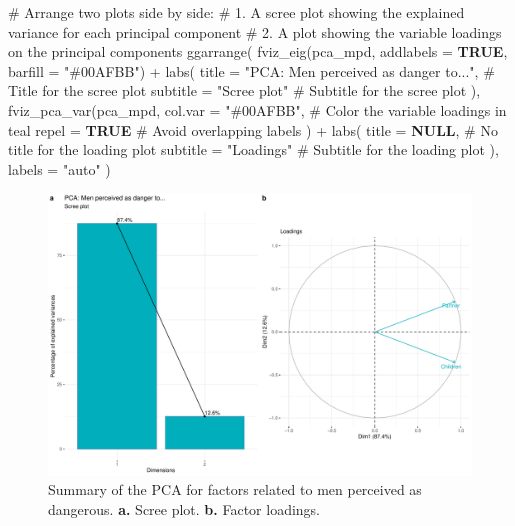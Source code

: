 \documentclass[
  bookmarksnumbered]{article}
\newenvironment{Shaded}{\begin{snugshade}}{\end{snugshade}}
\newcommand{\AttributeTok}[1]{\textcolor[rgb]{0.80,0.80,0.80}{#1}}
\newcommand{\CommentTok}[1]{\textcolor[rgb]{0.50,0.62,0.50}{#1}}
\newcommand{\ConstantTok}[1]{\textcolor[rgb]{0.86,0.64,0.64}{\textbf{#1}}}
\newcommand{\FunctionTok}[1]{\textcolor[rgb]{0.94,0.94,0.56}{#1}}
\newcommand{\NormalTok}[1]{\textcolor[rgb]{0.80,0.80,0.80}{#1}}
\newcommand{\SpecialCharTok}[1]{\textcolor[rgb]{0.86,0.64,0.64}{#1}}
\newcommand{\StringTok}[1]{\textcolor[rgb]{0.80,0.58,0.58}{#1}}
\begin{document}
\begin{Shaded}
\begin{Highlighting}[]
\CommentTok{\# Arrange two plots side by side:}
\CommentTok{\# 1. A scree plot showing the explained variance for each principal component}
\CommentTok{\# 2. A plot showing the variable loadings on the principal components}
\FunctionTok{ggarrange}\NormalTok{(}
  \FunctionTok{fviz\_eig}\NormalTok{(pca\_mpd, }\AttributeTok{addlabels =} \ConstantTok{TRUE}\NormalTok{, }\AttributeTok{barfill =} \StringTok{"\#00AFBB"}\NormalTok{) }\SpecialCharTok{+}
    \FunctionTok{labs}\NormalTok{(}
      \AttributeTok{title =} \StringTok{"PCA: Men perceived as danger to..."}\NormalTok{, }\CommentTok{\# Title for the scree plot}
      \AttributeTok{subtitle =} \StringTok{"Scree plot"} \CommentTok{\# Subtitle for the scree plot}
\NormalTok{    ),}
  \FunctionTok{fviz\_pca\_var}\NormalTok{(pca\_mpd,}
               \AttributeTok{col.var =} \StringTok{"\#00AFBB"}\NormalTok{, }\CommentTok{\# Color the variable loadings in teal}
               \AttributeTok{repel =} \ConstantTok{TRUE} \CommentTok{\# Avoid overlapping labels}
\NormalTok{  ) }\SpecialCharTok{+}
    \FunctionTok{labs}\NormalTok{(}
      \AttributeTok{title =} \ConstantTok{NULL}\NormalTok{, }\CommentTok{\# No title for the loading plot}
      \AttributeTok{subtitle =} \StringTok{"Loadings"} \CommentTok{\# Subtitle for the loading plot}
\NormalTok{    ),}
  \AttributeTok{labels =} \StringTok{"auto"}
\NormalTok{)}
\end{Highlighting}
\end{Shaded}

\begin{figure}
\centering
\includegraphics{Supplementary_material_files/figure-latex/pca-mpd-plot-1.pdf}
\caption{\label{fig:pca-mpd-plot}Summary of the PCA for factors related to men perceived as dangerous. \textbf{a.} Scree plot. \textbf{b.} Factor loadings.}
\end{figure}
\end{document}
